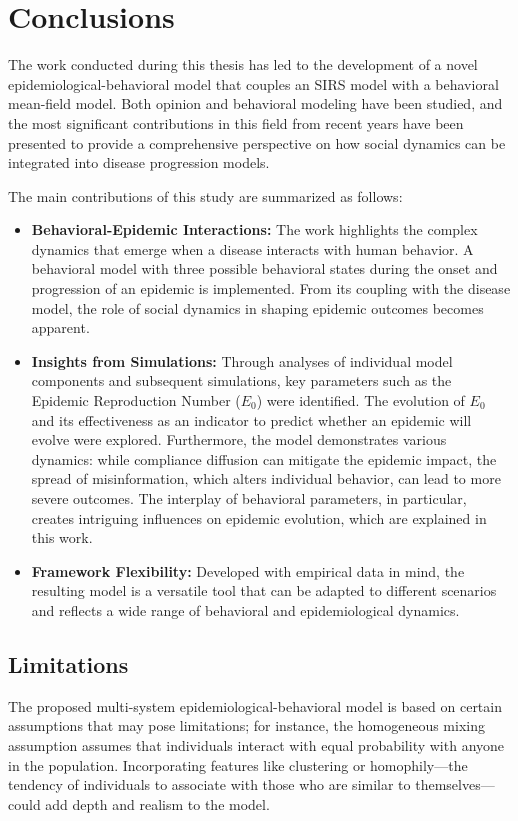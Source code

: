 \chapter{Conclusions}
\label{ch:conclusions}
The work conducted during this thesis has led to the development of a novel epidemiological-behavioral model that couples an SIRS model with a behavioral mean-field model. Both opinion and behavioral modeling have been studied, and the most significant contributions in this field from recent years have been presented to provide a comprehensive perspective on how social dynamics can be integrated into disease progression models.

The main contributions of this study are summarized as follows:
\begin{itemize}
	
\item \textbf{Behavioral-Epidemic Interactions:} The work highlights the complex dynamics that emerge when a disease interacts with human behavior. A behavioral model with three possible behavioral states during the onset and progression of an epidemic is implemented. From its coupling with the disease model, the role of social dynamics in shaping epidemic outcomes becomes apparent.

\item \textbf{Insights from Simulations:} Through analyses of individual model components and subsequent simulations, key parameters such as the Epidemic Reproduction Number ($E_0$) were identified. The evolution of $E_0$ and its effectiveness as an indicator to predict whether an epidemic will evolve were explored. Furthermore, the model demonstrates various dynamics: while compliance diffusion can mitigate the epidemic impact, the spread of misinformation, which alters individual behavior, can lead to more severe outcomes. The interplay of behavioral parameters, in particular, creates intriguing influences on epidemic evolution, which are explained in this work.

\item \textbf{Framework Flexibility:} Developed with empirical data in mind, the resulting model is a versatile tool that can be adapted to different scenarios and reflects a wide range of behavioral and epidemiological dynamics.
\end{itemize}

\section{Limitations}
The proposed multi-system epidemiological-behavioral model is based on certain assumptions that may pose limitations; for instance, the homogeneous mixing assumption assumes that individuals interact with equal probability with anyone in the population. Incorporating features like clustering or homophily—the tendency of individuals to associate with those who are similar to themselves—could add depth and realism to the model.

